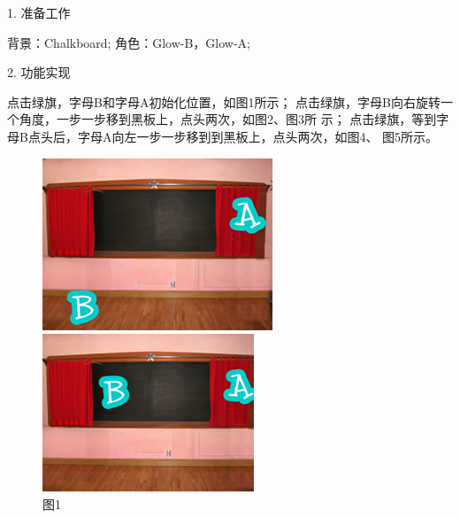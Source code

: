 \documentclass[10pt, a4paper]{article}
\begin{document}
\begin{enumerate}
        1. 准备工作
        \begin{tasks}[label = (\arabic*)]
            \task 背景：Chalkboard;
            \task 角色：Glow-B，Glow-A;
        \end{tasks}
        2. 功能实现
        \begin{tasks}[label = (\arabic*)]
            \task 点击绿旗，字母B和字母A初始化位置，如图1所示；
            \task 点击绿旗，字母B向右旋转一个角度，一步一步移到黑板上，点头两次，如图2、图3所
            示；
            \task 点击绿旗，等到字母B点头后，字母A向左一步一步移到到黑板上，点头两次，如图4、
            图5所示。
        \end{tasks}
        \begin{figure}[htbp]
            \centering
            \begin{minipage}[t]{.18\textwidth}
                \centering
                \includegraphics[width=\textwidth]{37-1.png}
                \caption*{图1}
            \end{minipage}
            \begin{minipage}[t]{.18\textwidth}
                \includegraphics[width=\textwidth]{37-2.png}

\end{minipage}
\end{figure}
\end{enumerate}
\end{document}
